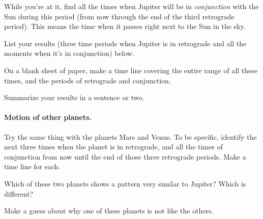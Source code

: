 While you're at it, find all the times 
when Jupiter will be
in \textit{conjunction} with the Sun during this period (from
now through the end of the third retrograde period). 
This means the time when
it passes right next to the Sun in the sky.

List your results (three time periods when Jupiter is in retrograde
and all the moments when it's in conjunction) below.

\vskip 3in

On a blank sheet of paper, make a time line covering the entire
range of all these times, and the periods of retrograde and conjunction.

Summarize your results in a sentence or two.

\vskip 1in

\paragraph{Motion of other planets.}
Try the same thing with the planets Mars and Venus.
To be specific, identify the next three times when the planet is 
in retrograde, and all the times of conjunction from now until the end of those
three
retrograde periods. Make a time line for each.

\vskip 5in

Which of these two planets shows a pattern very similar to Jupiter?
Which is different?

\vskip 1in

Make a guess about why one of these planets is not like the others.

\vskip 1in



